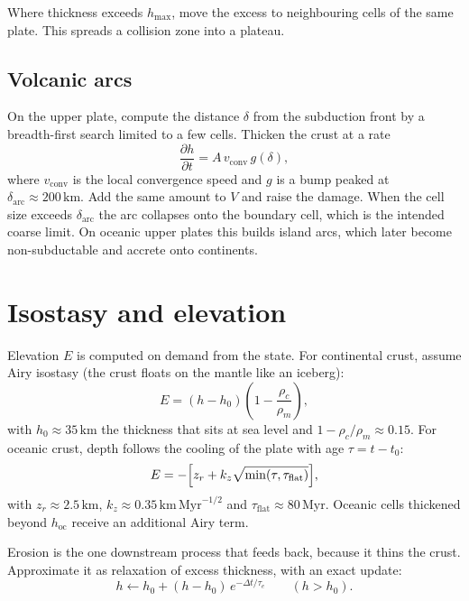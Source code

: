 \documentclass[11pt,a4paper]{article}
\newcommand{\Myr}{\,\mathrm{Myr}}
\newcommand{\km}{\,\mathrm{km}}
\begin{document}
Where thickness exceeds $h_\mathrm{max}$, move the excess to neighbouring
cells of the same plate. This spreads a collision zone into a plateau.

\subsection{Volcanic arcs}

On the upper plate, compute the distance $\delta$ from the subduction front by
a breadth-first search limited to a few cells. Thicken the crust at a rate
\begin{equation}
\frac{\partial h}{\partial t} = A\, v_\mathrm{conv}\, g(\delta),
\end{equation}
where $v_\mathrm{conv}$ is the local convergence speed and $g$ is a bump
peaked at $\delta_\mathrm{arc} \approx 200\km$. Add the same amount to $V$ and
raise the damage. When the cell size exceeds $\delta_\mathrm{arc}$ the arc
collapses onto the boundary cell, which is the intended coarse limit. On
oceanic upper plates this builds island arcs, which later become
non-subductable and accrete onto continents.

\section{Isostasy and elevation}\label{sec:iso}

Elevation $E$ is computed on demand from the state. For continental crust,
assume Airy isostasy (the crust floats on the mantle like an iceberg):
\begin{equation}
E = (h - h_0)\left(1 - \frac{\rho_c}{\rho_m}\right),
\end{equation}
with $h_0 \approx 35\km$ the thickness that sits at sea level and
$1 - \rho_c/\rho_m \approx 0.15$. For oceanic crust, depth follows the cooling
of the plate with age $\tau = t - t_0$:
\begin{equation}
E = -\Bigl[z_r + k_z \sqrt{\min(\tau, \tau_\mathrm{flat})}\Bigr],
\end{equation}
with $z_r \approx 2.5\km$, $k_z \approx 0.35\km\,\mathrm{Myr}^{-1/2}$ and
$\tau_\mathrm{flat} \approx 80\Myr$. Oceanic cells thickened beyond
$h_\mathrm{oc}$ receive an additional Airy term.

Erosion is the one downstream process that feeds back, because it thins the
crust. Approximate it as relaxation of excess thickness, with an exact update:
\begin{equation}
h \leftarrow h_0 + (h - h_0)\,e^{-\Delta t/\tau_e} \qquad (h > h_0).
\end{equation}
\end{document}
